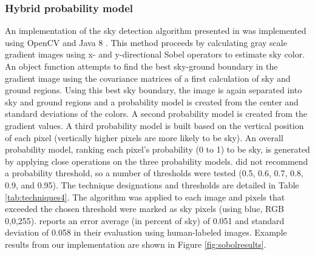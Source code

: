 \documentclass[final,3p,times,authoryear]{elsarticle}
\begin{document}
\subsubsection{Hybrid probability model}\label{sec:prob}
An implementation of the sky detection algorithm presented in \cite{Wang2015a} was implemented using OpenCV \citep{Bradski2000} and Java 8 \citep{Oracle2018}. This method proceeds by calculating gray scale gradient images using x- and y-directional Sobel operators to estimate sky color. An object function attempts to find the best sky-ground boundary in the gradient image using the covariance matrices of a first calculation of sky and ground regions. Using this best sky boundary, the image is again separated into sky and ground regions and a probability model is created from the center and standard deviations of the colors. A second probability model is created from the gradient values. A third probability model is built based on the vertical position of each pixel (vertically higher pixels are more likely to be sky). An overall probability model, ranking each pixel's probability (0 to 1) to be sky, is generated by applying close operations on the three probability models. \cite{Wang2015a} did not recommend a probability threshold, so a number of thresholds were tested (0.5, 0.6, 0.7, 0.8, 0.9, and 0.95). The technique designations and thresholds are detailed in Table \ref{tab:techniques4}. The algorithm was applied to each image and pixels that exceeded the chosen threshold were marked as sky pixels (using blue, RGB 0,0,255). \cite{Wang2015a} reports an error average (in percent of sky) of 0.051 and standard deviation of 0.058 in their evaluation using human-labeled images.  Example results from our implementation are shown in Figure \ref{fig:sobolresults}. 
\end{document}
